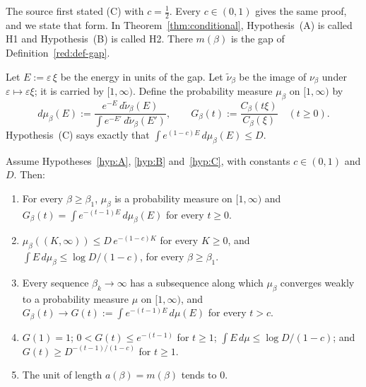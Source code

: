 The source first stated (C) with $c=\tfrac12$. Every $c\in(0,1)$ gives the same proof, and we state that form. In Theorem~\ref{thm:conditional}, Hypothesis~(A) is called H1 and Hypothesis~(B) is called H2. There $m(\beta)$ is the gap of Definition~\ref{red:def-gap}.

Let $E:=\varepsilon\,\xi$ be the energy in units of the gap. Let $\tilde\nu_\beta$ be the image of $\nu_\beta$ under $\varepsilon\mapsto\varepsilon\xi$; it is carried by $[1,\infty)$. Define the probability measure $\mu_\beta$ on $[1,\infty)$ by
\begin{equation}\label{red:mu}
  d\mu_\beta(E):=\frac{e^{-E}\,d\tilde\nu_\beta(E)}{\int e^{-E'}\,d\tilde\nu_\beta(E')},
  \qquad
  G_\beta(t):=\frac{C_\beta(t\xi)}{C_\beta(\xi)}\quad(t\ge0).
\end{equation}
Hypothesis~(C) says exactly that $\int e^{(1-c)E}\,d\mu_\beta(E)\le D$.

\begin{theorem}[Theorem R$'$]\label{thm:reduction}
Assume Hypotheses~\ref{hyp:A}, \ref{hyp:B} and~\ref{hyp:C}, with constants $c\in(0,1)$ and $D$. Then:
\begin{enumerate}
\item[(R1)] For every $\beta\ge\beta_1$, $\mu_\beta$ is a probability measure on $[1,\infty)$ and $G_\beta(t)=\int e^{-(t-1)E}\,d\mu_\beta(E)$ for every $t\ge0$.
\item[(R2)] $\mu_\beta((K,\infty))\le D\,e^{-(1-c)K}$ for every $K\ge0$, and $\int E\,d\mu_\beta\le \log D/(1-c)$, for every $\beta\ge\beta_1$.
\item[(R3)] Every sequence $\beta_k\to\infty$ has a subsequence along which $\mu_{\beta}$ converges weakly to a probability measure $\mu$ on $[1,\infty)$, and $G_\beta(t)\to G(t):=\int e^{-(t-1)E}\,d\mu(E)$ for every $t>c$.
\item[(R4)] $G(1)=1$; $0<G(t)\le e^{-(t-1)}$ for $t\ge1$; $\int E\,d\mu\le\log D/(1-c)$; and $G(t)\ge D^{-(t-1)/(1-c)}$ for $t\ge1$.
\item[(R5)] The unit of length $a(\beta)=m(\beta)$ tends to $0$.
\end{enumerate}
\end{theorem}

